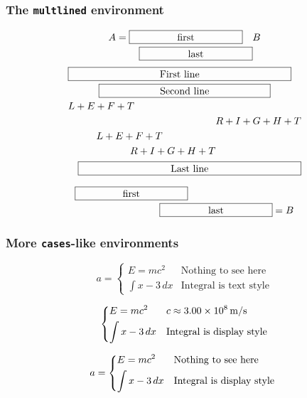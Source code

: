 \documentclass{article}
\begin{document}
\subsubsection{The \texttt{multlined} environment}

\[
  A = \begin{multlined}[t]
        \framebox[4cm]{first} \\
        \framebox[4cm]{last}
      \end{multlined} B
\]
\[
  \begin{multlined}
    \framebox[.65\columnwidth]{First line} \\
    \framebox[.5\columnwidth]{Second line} \\
    \shoveleft{L+E+F+T}         \\
    \shoveright{R+I+G+H+T}         \\
    \shoveleft[1cm]{L+E+F+T}         \\
    \shoveright[\widthof{$R+I+G+H+T$}]{R+I+G+H+T}         \\
    \framebox[.65\columnwidth]{Last line}
  \end{multlined}
\]

\[
    \begin{multlined}[b][7cm]
        \framebox[4cm]{first} \\
        \framebox[4cm]{last}
      \end{multlined} = B
\]

\subsubsection{More \texttt{cases}-like environments}

\[
  a=\begin{cases}
    E = m c^2     & \text{Nothing to see here} \\
    \int x-3\, dx & \text{Integral is text style}
  \end{cases}
\]

\[
  \begin{dcases}
    E = m c^2     & c \approx 3.00\times 10^{8}\,\mathrm{m}/\mathrm{s} \\
    \int x-3\, dx & \text{Integral is display style}
  \end{dcases}
\]

\[
  a= \begin{dcases*}
    E = m c^2     & Nothing to see here \\
    \int x-3\, dx & Integral is display style
  \end{dcases*}
\]
\end{document}
